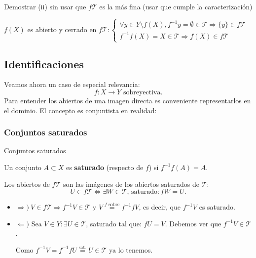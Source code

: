 \begin{enun}    
Demostrar (ii) sin usar que $f\mathcal{T}$ es la más fina (usar que cumple la caracterización)
\end{enun}

\begin{obs}
$f\left( X \right)$ es abierto y cerrado en $f\mathcal{T}: \begin{cases}
    \forall y \in Y \setminus f\left( X \right), f^{-1}y = \emptyset \in \mathcal{T} \Rightarrow \{y\} \in f\mathcal{T}\\
    f^{-1}f\left( X \right) = X \in \mathcal{T} \Rightarrow f\left( X \right) \in f\mathcal{T}
\end{cases}$
\end{obs}

\subsection{Identificaciones}
\label{sub:identificaciones}
Veamos ahora un caso de especial relevancia:
\[
\boxed{f: X \rightarrow Y \text{ sobreyectiva}.} 
\]
Para entender los abiertos de una imagen directa es conveniente representarlos en el dominio. El concepto es conjuntista en realidad:

\subsubsection*{Conjuntos saturados}
Conjuntos saturados\begin{defi}
Un conjunto $A \subset X$ es \textbf{saturado} (respecto de $f$) si $f^{-1}f\left( A \right) = A$.
\end{defi}
\begin{prop}
Los abiertos de $f\mathcal{T}$ son las imágenes de los abiertos saturados de $\mathcal{T}$:
\[
U \in f \mathcal{T} \Leftrightarrow \exists W \in \mathcal{T}\text{, saturado}: fW = U.
\]
\end{prop}
\begin{demo}
\begin{itemize}
    \item $\Rightarrow)\ V \in f\mathcal{T} \Rightarrow f^{-1}V \in \mathcal{T}$ y $V \stackrel{f \text{ sobre}}{=} f^{-1}fV$, es decir, que $f^{-1} V$ es saturado.
    \item $\Leftarrow)$ Sea $V \in Y: \exists U \in \mathcal{T}$, saturado tal que: $fU = V$. Debemos ver que $f^{-1}V \in \mathcal{T}$.

    Como $f^{-1}V = f^{-1}fU \stackrel{\text{sat.}}{=} U \in \mathcal{T}$ ya lo tenemos.
\end{itemize}
\end{demo}

